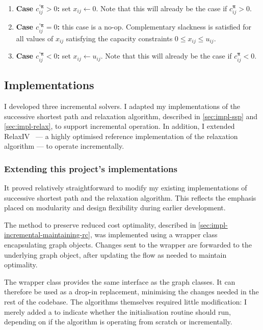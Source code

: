\begin{enumerate}
    \item \textbf{Case $c_{ij}^{\prime\boldsymbol{\pi}} > 0$:} set $x_{ij} \gets 0$. Note that this will already be the case if $c_{ij}^{\boldsymbol{\pi}} > 0$.
    \item \textbf{Case $c_{ij}^{\prime\boldsymbol{\pi}} = 0$: } this case is a no-op. Complementary slackness is satisfied for all values of $x_{ij}$ satisfying the capacity constraints $0 \leq x_{ij} \leq u_{ij}$.
    \item \textbf{Case $c_{ij}^{\prime\boldsymbol{\pi}} < 0$: } set $x_{ij} \gets u_{ij}$. Note that this will already be the case if $c_{ij}^{\boldsymbol{\pi}} < 0$.
\end{enumerate}

\subsection{Implementations} \label{sec:impl-incremental-impl}

I developed three incremental solvers. I adapted my implementations of the successive shortest path and relaxation algorithm, described in \cref{sec:impl-ssp} and \cref{sec:impl-relax}, to support incremental operation. In addition, I extended RelaxIV~\cite{BertsekasCodes:1988,RelaxIV:2011} --- a highly optimised reference implementation of the relaxation algorithm --- to operate incrementally.

\subsubsection{Extending this project's implementations}
It proved relatively straightforward to modify my existing implementations of successive shortest path and the relaxation algorithm. This reflects the emphasis placed on modularity and design flexibility during earlier development.

The method to preserve reduced cost optimality, described in \cref{sec:impl-incremental-maintaining-rc}, was implemented using a wrapper class encapsulating graph objects. Changes sent to the wrapper are forwarded to the underlying graph object, after updating the flow as needed to maintain optimality. 

The wrapper class provides the same interface as the graph classes. It can therefore be used as a drop-in replacement, minimising the changes needed in the rest of the codebase. The algorithms themselves required little modification: I merely added a to indicate whether the initialisation routine should run, depending on if the algorithm is operating from scratch or incrementally.
 
